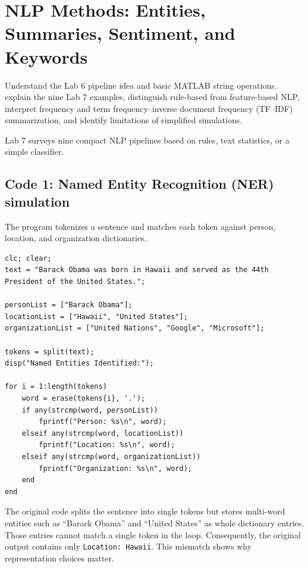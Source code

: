 \chapter{NLP Methods: Entities, Summaries, Sentiment, and Keywords}
\label{ch:nlp-methods}

\chapterguide%
  {Understand the Lab 6 pipeline idea and basic MATLAB string operations.}
  {explain the nine Lab 7 examples, distinguish rule-based from feature-based NLP, interpret frequency and term frequency--inverse document frequency (TF--IDF) summarization, and identify limitations of simplified simulations.}

Lab 7 surveys nine compact NLP pipelines based on rules, text statistics, or a simple classifier.

\section{Code 1: Named Entity Recognition (NER) simulation}

The program tokenizes a sentence and matches each token against person, location, and organization dictionaries.

\begin{lstlisting}[style=mlmatlab]
clc; clear;
text = "Barack Obama was born in Hawaii and served as the 44th President of the United States.";

personList = ["Barack Obama"];
locationList = ["Hawaii", "United States"];
organizationList = ["United Nations", "Google", "Microsoft"];

tokens = split(text);
disp("Named Entities Identified:");

for i = 1:length(tokens)
    word = erase(tokens{i}, '.');
    if any(strcmp(word, personList))
        fprintf("Person: %s\n", word);
    elseif any(strcmp(word, locationList))
        fprintf("Location: %s\n", word);
    elseif any(strcmp(word, organizationList))
        fprintf("Organization: %s\n", word);
    end
end
\end{lstlisting}

\begin{pitfall}
The original code splits the sentence into single tokens but stores multi-word entities such as ``Barack Obama'' and ``United States'' as whole dictionary entries. Those entries cannot match a single token in the loop. Consequently, the original output contains only \texttt{Location: Hawaii}. This mismatch shows why representation choices matter.
\end{pitfall}

